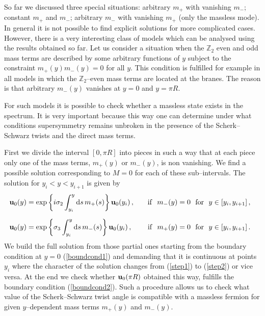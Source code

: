 \documentclass[a4paper,12pt]{article}
\def\si{\sigma}
\def\d{{\rm d}}
\def\bu{{\bf u}}
\def\ZZ{\mathbb Z}
\begin{document}
So far we discussed three special situations: arbitrary $m_+$ with
vanishing $m_-$; constant $m_+$ and $m_-$; arbitrary $m_-$ with 
vanishing $m_+$ (only the massless mode). In general it is not
possible to find explicit solutions for more complicated cases. 
However, there is a very interesting class of models which can be
analysed using the results obtained so far. Let us consider a
situation when the $\ZZ_2$ even and odd mass terms are described by
some arbitrary functions of $y$ subject to the constraint
$m_+(y)m_-(y)=0$ for all $y$. This condition is fulfilled for example 
in all models in which the $\ZZ_2$--even mass terms are located at the
branes. The reason is that arbitrary $m_-(y)$ vanishes at $y=0$ and
$y=\pi R$. 


For such models it is possible to check whether a massless state
exists in the spectrum. It is very important because this way one can
determine under what conditions supersymmetry remains unbroken in the
presence of the Scherk--Schwarz twists and the direct mass terms.


First we divide the interval $[0,\pi R]$ into pieces in such a way
that at each piece only one of the mass terms, $m_+(y)$ or $m_-(y)$,
is non vanishing. We find a possible solution corresponding to $M=0$
for each of these sub--intervals. The solution for $y_i<y<y_{i+1}$ is
given by 
\begin{eqnarray}
\bu_0(y)=\exp\left\{i\si_2\int_{y_i}^y\d s\,m_+(s)\right\}\bu_0(y_i)
\,,\quad&&{\rm if\ \ } m_-(y)=0 {\rm\ \ for\ \ } y\in[y_i,y_{i+1}]
\,,\,\,\,\,
\label{step1}
\\[6pt]
\bu_0(y)=\exp\left\{\si_3\int_{y_i}^y\d s\,m_-(s)\right\}\bu_0(y_i)
\,,\,\,\quad&&{\rm if\ \ } m_+(y)=0 {\rm\ \ for\ \ } y\in[y_i,y_{i+1}]
\,.\,\,\,\,
\label{step2}
\end{eqnarray}
We build the full solution from those partial ones starting from the
boundary condition at $y=0$ (\ref{boundcond1}) and demanding that
it is continuous at points $y_i$ where the character of the solution
changes from (\ref{step1}) to (\ref{step2}) or vice versa. At the end
we check whether $\bu_0(\pi R)$ obtained this way, fulfills the
boundary condition (\ref{boundcond2}). Such a procedure allows us to
check what value of the Scherk--Schwarz twist angle is compatible with
a massless fermion for given $y$--dependent mass terms $m_+(y)$ and
$m_-(y)$. 
\end{document}

